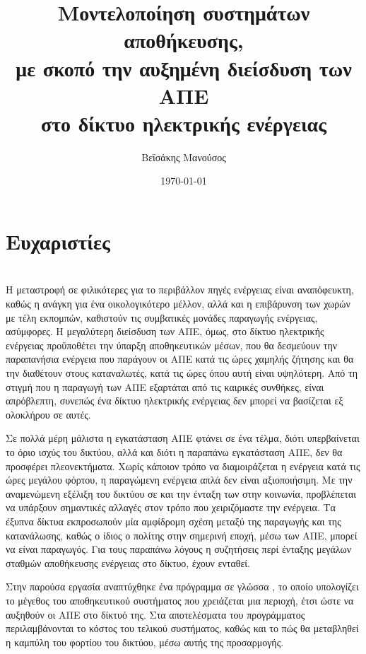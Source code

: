 \documentclass[12pt]{report}
\author{Βεϊσάκης Μανούσος}
\title{Μοντελοποίηση συστημάτων αποθήκευσης, \\με σκοπό την αυξημένη διείσδυση των ΑΠΕ \\στο δίκτυο ηλεκτρικής ενέργειας}
\date{\today}
\begin{document}
\maketitle
\tableofcontents
\chapter*{Ευχαριστίες}
\chapter*{{}}
Η μεταστροφή σε φιλικότερες για το περιβάλλον πηγές ενέργειας είναι αναπόφευκτη, καθώς η ανάγκη για ένα οικολογικότερο μέλλον, αλλά και η επιβάρυνση των χωρών με τέλη εκπομπών, καθιστούν τις συμβατικές μονάδες παραγωγής ενέργειας,
ασύμφορες. Η μεγαλύτερη διείσδυση των ΑΠΕ, όμως, στο δίκτυο ηλεκτρικής ενέργειας προϋποθέτει την ύπαρξη αποθηκευτικών μέσων, που θα δεσμεύουν την παραπανήσια ενέργεια που παράγουν οι ΑΠΕ κατά τις ώρες
χαμηλής ζήτησης και θα την διαθέτουν στους καταναλωτές, κατά τις ώρες όπου αυτή είναι υψηλότερη. 
Από τη στιγμή που η παραγωγή των ΑΠΕ εξαρτάται από τις καιρικές συνθήκες, είναι απρόβλεπτη, συνεπώς ένα δίκτυο ηλεκτρικής ενέργειας δεν μπορεί να βασίζεται εξ ολοκλήρου σε αυτές.

Σε πολλά μέρη μάλιστα η εγκατάσταση ΑΠΕ φτάνει σε ένα τέλμα, διότι υπερβαίνεται το όριο ισχύς του δικτύου, αλλά και διότι η παραπάνω εγκατάσταση ΑΠΕ, δεν θα προσφέρει πλεονεκτήματα. 
Χωρίς κάποιον τρόπο να διαμοιράζεται η ενέργεια κατά τις ώρες μεγάλου φόρτου, η παραγώμενη ενέργεια απλά δεν είναι αξιοποιήσιμη.
Με την αναμενώμενη εξέλιξη του δικτύου σε {} και την ένταξη των {} στην κοινωνία, προβλέπεται να υπάρξουν σημαντικές αλλαγές στον τρόπο που χειριζόμαστε την ενέργεια. Τα έξυπνα
δίκτυα εκπροσωπούν μία αμφίδρομη σχέση μεταξύ της παραγωγής και της κατανάλωσης, καθώς ο ίδιος ο πολίτης στην σημερινή εποχή, μέσω των ΑΠΕ, μπορεί να είναι παραγωγός. Για τους παραπάνω λόγους η συζητήσεις 
περί ένταξης μεγάλων σταθμών αποθήκευσης ενέργειας στο δίκτυο, έχουν ενταθεί. 

Στην παρούσα εργασία αναπτύχθηκε ένα πρόγραμμα σε γλώσσα {}, το οποίο υπολογίζει το μέγεθος του αποθηκευτικού συστήματος που χρειάζεται μια περιοχή, έτσι ώστε να αυξηθούν οι ΑΠΕ στο δίκτυό της. 
Στα αποτελέσματα του προγράμματος περιλαμβάνονται το κόστος του τελικού συστήματος, καθώς και το πώς θα μεταβληθεί η καμπύλη του φορτίου του δικτύου, μέσω αυτής της προσαρμογής.
\end{document}
